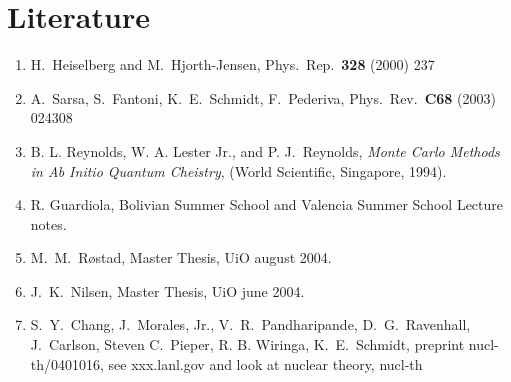 \section*{Literature}
\begin{enumerate}
\item H.~Heiselberg and M.~Hjorth-Jensen, Phys.~Rep.~{\bf 328} (2000) 237
\item A.~Sarsa, S.~Fantoni, K.~E.~Schmidt, F.~Pederiva, Phys.~Rev.~{\bf C68} (2003) 024308
\item B. L. Reynolds, W. A. Lester Jr., and P. J.~Reynolds, {\em Monte Carlo Methods in Ab Initio Quantum Cheistry}, (World Scientific, Singapore, 1994). 
\item R. Guardiola, Bolivian Summer School and Valencia Summer School Lecture notes.
\item M.~M.~R\o stad, Master Thesis, UiO august 2004.
\item J.~K.~Nilsen, Master Thesis, UiO june 2004.
\item  S.~Y.~Chang, J.~Morales, Jr., V.~R.~Pandharipande, D.~G.~Ravenhall, J.~Carlson, Steven C.~Pieper, R. B. Wiringa, K.~E.~Schmidt, preprint nucl-th/0401016, see xxx.lanl.gov and look at nuclear theory, nucl-th
\end{enumerate}







